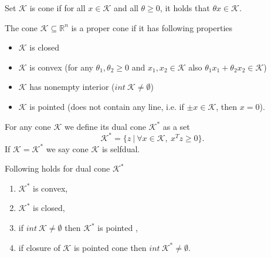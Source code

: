 \documentclass[12pt]{book}
\theoremstyle{definition}
\begin{document}
\begin{appendix}
\label{defCone}
Set $\mathcal{K}$ is cone if for all $x\in \mathcal{K}$ and all $\theta\geq 0$, it holds that $\theta x \in \mathcal{K}$.



\label{defProperCone}
The cone $\mathcal{K}\subseteq \mathbb{R}^n$ is a proper cone if it has following properties
\begin{itemize}
\item $\mathcal{K}$ is closed
\item $\mathcal{K}$ is convex (for any $\theta_1,\theta_2\geq 0$ and $x_1,x_2\in\mathcal{K}$ also $\theta_1x_1 + \theta_2x_2 \in\mathcal{K}$)
\item $\mathcal{K}$ has nonempty interior  ($int \ \mathcal{K} \neq \emptyset$)
\item $\mathcal{K}$ is pointed (does not contain any line, i.e. if $\pm x\in \mathcal{K}$, then $x=0$).
\end{itemize}

\label{defDualCone}
For any cone $\mathcal{K}$ we define its dual cone $\mathcal{K}^*$ as a set
\begin{equation}
\mathcal{K}^* = \{z\ |\ \forall x\in\mathcal{K}, \ x^Tz\geq 0\}.
\end{equation}
If  $\mathcal{K} =  \mathcal{K}^*$ we say cone $\mathcal{K}$ is selfdual.




\prop[{[\ref{PokornaSOCPDipl}]}] \label{DualConePropertiesProp}
Following holds for dual cone $\mathcal{K}^*$
\begin{enumerate}
\item  $\mathcal{K}^*$ is convex,
\item  $\mathcal{K}^*$ is closed,
\item if $int \ \mathcal{K}\neq \emptyset$ then $\mathcal{K}^*$ is pointed ,
\item if closure of $\mathcal{K}$ is pointed cone then $int \ \mathcal{K}^*\neq \emptyset$.
\end{enumerate}


\end{appendix}
\end{document}
